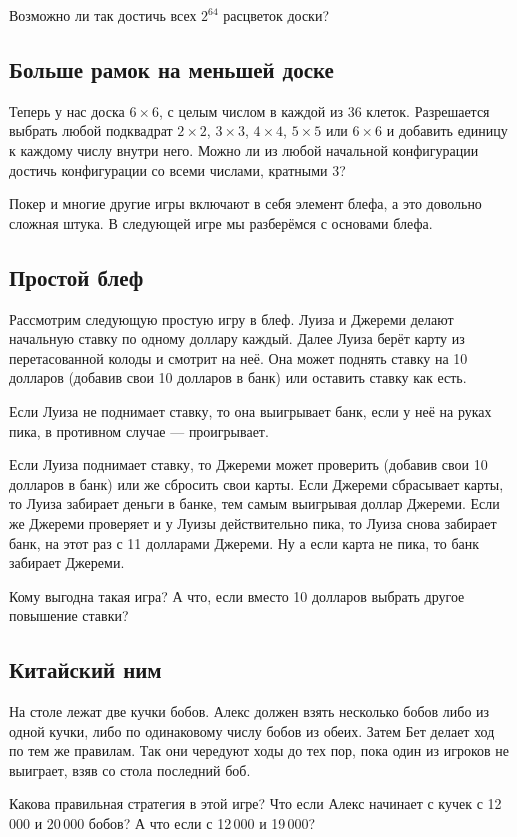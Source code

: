 Возможно ли так достичь всех $2^{64}$ расцветок доски?

\subsection*{Больше рамок на меньшей доске}

Теперь у нас доска $6 \times 6$, с целым числом в каждой из $36$ клеток.
Разрешается выбрать любой подквадрат $2 \times 2$, $3 \times 3$, $4 \times 4$, $5 \times 5$ или $6 \times 6$ и добавить единицу к каждому числу внутри него.
Можно ли из любой начальной конфигурации достичь конфигурации со всеми числами, кратными $3$?


\medskip

Покер и многие другие игры включают в себя элемент блефа, а это довольно сложная штука.
В следующей игре мы разберёмся с основами блефа.

\subsection*{Простой блеф}

Рассмотрим следующую простую игру в блеф.
Луиза и Джереми делают начальную ставку по одному доллару каждый.
Далее Луиза берёт карту из перетасованной колоды и смотрит на неё.
Она может поднять ставку на 10 долларов (добавив свои 10 долларов в банк) или оставить ставку как есть.

Если Луиза не поднимает ставку, то она выигрывает банк, если у неё на руках пика, в противном случае --- проигрывает.

Если Луиза поднимает ставку, то Джереми может проверить (добавив свои 10 долларов в банк) или же сбросить свои карты.
Если Джереми сбрасывает карты, то Луиза забирает деньги в банке, тем самым выигрывая доллар Джереми.
Если же Джереми проверяет и у Луизы действительно пика, то Луиза снова забирает банк, на этот раз с 11 долларами Джереми.
Ну а если карта не пика, то банк забирает Джереми.

Кому выгодна такая игра?
А что, если вместо 10 долларов выбрать другое повышение ставки?

\subsection*{Китайский ним}

На столе лежат две кучки бобов.
Алекс должен взять несколько бобов либо из одной кучки, либо по одинаковому числу бобов из обеих.
Затем Бет делает ход по тем же правилам.
Так они чередуют ходы до тех пор, пока один из игроков не выиграет, взяв со стола последний боб.

Какова правильная стратегия в этой игре?
Что если Алекс начинает с кучек с 12\,000 и 20\,000 бобов?
А что если с 12\,000 и 19\,000?
